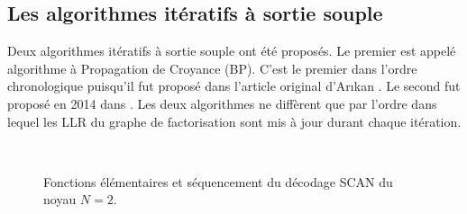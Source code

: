 \subsection{Les algorithmes itératifs à sortie souple}
\label{subsec:soft_algo}

Deux algorithmes itératifs à sortie souple ont été proposés. Le premier est appelé algorithme à Propagation de Croyance (BP). C'est le premier dans l'ordre chronologique puisqu'il fut proposé dans l'article original d'Ar{\i}kan \cite{arikan_channel_2009}. Le second fut proposé en 2014 dans \cite{fayyaz_low-complexity_2014}. Les deux algorithmes ne diffèrent que par l'ordre dans lequel les LLR du graphe de factorisation sont mis à jour durant chaque itération.

\begin{figure}[t]
  \renewcommand*\thesubfigure{\arabic{subfigure}} 
  \centering
  \hspace{2.5cm}
  \\
  \hspace{0.5cm}
  \hspace{3.7cm}
  \caption{Fonctions élémentaires et séquencement du décodage SCAN du noyau $N=2$.}
  \label{fig:SCANSchedule}
\end{figure}

